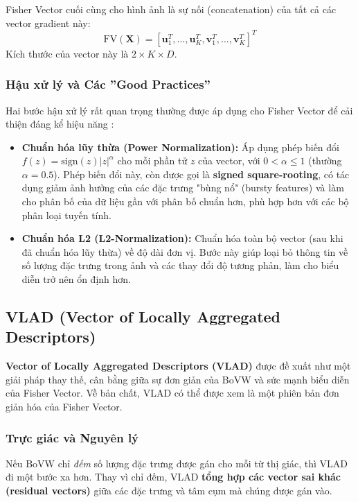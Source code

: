 Fisher Vector cuối cùng cho hình ảnh là sự nối (concatenation) của tất cả các vector gradient này:
\begin{equation}
    \text{FV}(\mathbf{X}) = \left[ \mathbf{u}_1^T, ..., \mathbf{u}_K^T, \mathbf{v}_1^T, ..., \mathbf{v}_K^T \right]^T
\end{equation}
Kích thước của vector này là $2 \times K \times D$.

\subsubsection{Hậu xử lý và Các ''Good Practices''}
\label{subsubsec:fv_postprocessing}
Hai bước hậu xử lý rất quan trọng thường được áp dụng cho Fisher Vector để cải thiện đáng kể hiệu năng \cite{Sanchez2013}:
\begin{itemize}
    \item \textbf{Chuẩn hóa lũy thừa (Power Normalization):} Áp dụng phép biến đổi $f(z) = \text{sign}(z) |z|^\alpha$ cho mỗi phần tử $z$ của vector, với $0 < \alpha \le 1$ (thường $\alpha=0.5$). Phép biến đổi này, còn được gọi là \textbf{signed square-rooting}, có tác dụng giảm ảnh hưởng của các đặc trưng "bùng nổ" (bursty features) và làm cho phân bố của dữ liệu gần với phân bố chuẩn hơn, phù hợp hơn với các bộ phân loại tuyến tính.
    \item \textbf{Chuẩn hóa L2 (L2-Normalization):} Chuẩn hóa toàn bộ vector (sau khi đã chuẩn hóa lũy thừa) về độ dài đơn vị. Bước này giúp loại bỏ thông tin về số lượng đặc trưng trong ảnh và các thay đổi độ tương phản, làm cho biểu diễn trở nên ổn định hơn.
\end{itemize}

\subsection{VLAD (Vector of Locally Aggregated Descriptors)}
\label{subsec:vlad}

\textbf{Vector of Locally Aggregated Descriptors (VLAD)} \cite{Jegou2012} được đề xuất như một giải pháp thay thế, cân bằng giữa sự đơn giản của BoVW và sức mạnh biểu diễn của Fisher Vector. Về bản chất, VLAD có thể được xem là một phiên bản đơn giản hóa của Fisher Vector.

\subsubsection{Trực giác và Nguyên lý}
\label{subsubsec:vlad_intuition}
Nếu BoVW chỉ \textit{đếm} số lượng đặc trưng được gán cho mỗi từ thị giác, thì VLAD đi một bước xa hơn. Thay vì chỉ đếm, VLAD \textbf{tổng hợp các vector sai khác (residual vectors)} giữa các đặc trưng và tâm cụm mà chúng được gán vào.

